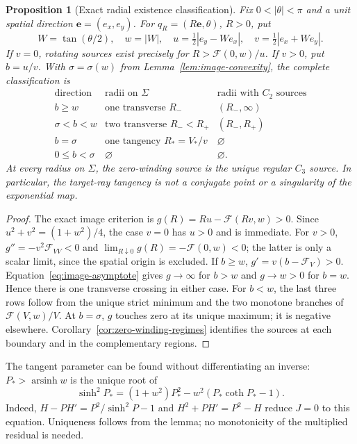\documentclass[11pt,a4paper]{article}
\newtheorem{proposition}[theorem]{Proposition}
\theoremstyle{remark}\newtheorem{remark}[theorem]{Remark}
\begin{document}
\begin{proposition}[Exact radial existence classification]
\label{prop:radial-existence}
Fix $0<|\theta|<\pi$ and a unit spatial direction
$\mathbf e=(e_x,e_y)$. For $q_R=(R\mathbf e,\theta)$, $R>0$, put
\[
 W=\tan(\theta/2),\quad w=|W|,\quad
 u=\tfrac12|e_y-We_x|,\quad v=\tfrac12|e_x+We_y|.
\]
If $v=0$, rotating sources exist precisely for
$R>\mathcal F(0,w)/u$. If $v>0$, put $b=u/v$. With $\sigma=\sigma(w)$
from Lemma~\ref{lem:image-convexity}, the complete classification is
\[
\begin{array}{c|c|c}
\text{direction}&\text{radii on }\Sigma&\text{radii with }C_2\text{ sources}\\ \hline
b\ge w&\text{one transverse }R_-&(R_-,\infty)\\
\sigma<b<w&\text{two transverse }R_-<R_+&(R_-,R_+)\\
b=\sigma&\text{one tangency }R_*=V_*/v&\varnothing\\
0\le b<\sigma&\varnothing&\varnothing.
\end{array}
\]
At every radius on $\Sigma$, the zero-winding source is the unique
regular $C_3$ source. In particular, the target-ray tangency is not
a conjugate point or a singularity of the exponential map.
\end{proposition}
\begin{proof}
The exact image criterion is $g(R)=Ru-\mathcal F(Rv,w)>0$.
Since $u^2+v^2=(1+w^2)/4$, the case $v=0$ has $u>0$ and is immediate.
For $v>0$, $g''=-v^2\mathcal F_{VV}<0$ and
$\lim_{R\downarrow0}g(R)=-\mathcal F(0,w)<0$; the latter is only
a scalar limit, since the spatial origin is excluded.
If $b\ge w$, $g'=v(b-\mathcal F_V)>0$. Equation~\eqref{eq:image-asymptote}
gives $g\to\infty$ for $b>w$ and $g\to w>0$ for $b=w$.
Hence there is one transverse crossing in either case. For $b<w$,
the last three rows follow from the unique strict minimum and the
two monotone branches of $\mathcal F(V,w)/V$.
At $b=\sigma$, $g$ touches zero at its unique maximum; it is negative
elsewhere. Corollary~\ref{cor:zero-winding-regimes} identifies the
sources at each boundary and in the complementary regions.
\end{proof}

The tangent parameter can be found without differentiating an inverse:
$P_*>\operatorname{arsinh}w$ is the unique root of
\[
 \sinh^2P_*=(1+w^2)P_*^2-w^2(P_*\coth P_*-1).
\]
Indeed, $H-PH'=P^2/\sinh^2P-1$ and $H^2+PH'=P^2-H$
reduce $J=0$ to this equation. Uniqueness follows from the lemma;
no monotonicity of the multiplied residual is needed.
\end{document}
